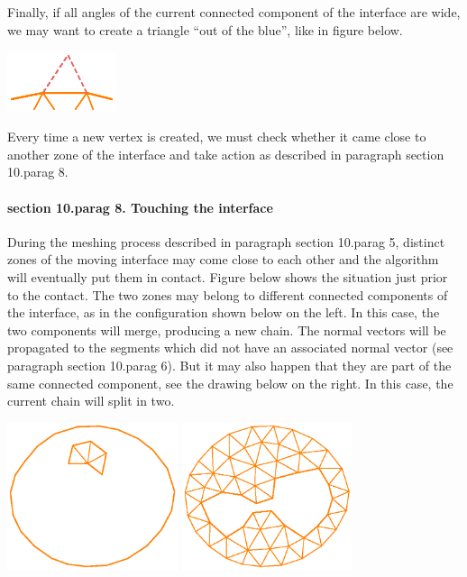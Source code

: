 {Finally, if all angles of the current connected component of the interface are wide,
we may want to create a triangle ``out of the blue'', like in figure below.

\centerline{\includegraphics[width=32mm]{fill-blue.eps}}

Every time a new vertex is created, we must check whether it came close to another
zone of the interface and take action as described in paragraph \numb section 10.\numb parag 8.


\paragraph{\numb section 10.\numb parag 8. Touching the interface}

During the meshing process described in paragraph \numb section 10.\numb parag 5,
distinct zones of the moving interface may
come close to each other and the algorithm will eventually put them in contact.
Figure below shows the situation just prior to the contact.
The two zones may belong to different connected components of the interface,
as in the configuration shown below on the left.
In this case, the two components will merge, producing a new chain.
The normal vectors will be propagated to the segments which did not have an associated
normal vector (see paragraph \numb section 10.\numb parag 6).
But it may also happen that they are part of the same connected component,
see the drawing below on the right.
In this case, the current chain will split in two.

\centerline{\includegraphics[width=5cm]{touching-interf-1.eps}
\hskip5mm \includegraphics[width=5cm]{touching-interf-2.eps}}

}

